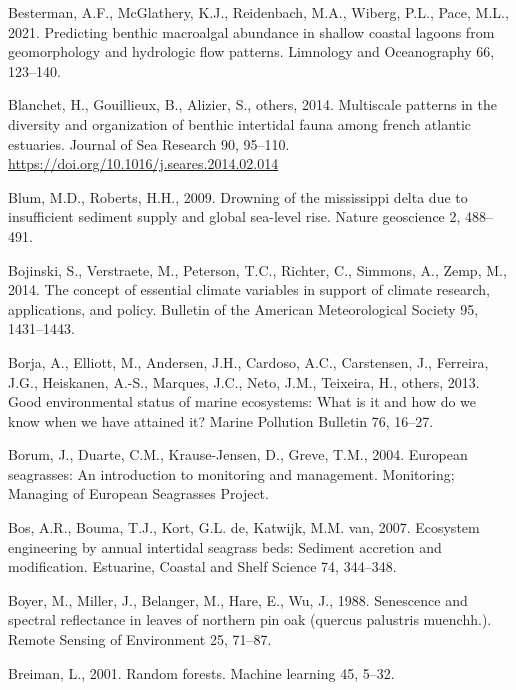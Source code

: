 \documentclass[
  letterpaper,
  11pt,
  english,
  singlespacing,
  headsepline]{MastersDoctoralThesis}
\newlength{\cslhangindent}
\newenvironment{CSLReferences}[2] %
 {\begin{list}{}{%
  \setlength{\itemindent}{0pt}
  \setlength{\leftmargin}{0pt}
  \setlength{\parsep}{0pt}
  \ifodd #1
   \setlength{\leftmargin}{\cslhangindent}
   \setlength{\itemindent}{-1\cslhangindent}
  \fi
  \setlength{\itemsep}{#2\baselineskip}}}
 {\end{list}}
\begin{document}
\begin{CSLReferences}{1}{0}
Besterman, A.F., McGlathery, K.J., Reidenbach, M.A., Wiberg, P.L., Pace,
M.L., 2021. Predicting benthic macroalgal abundance in shallow coastal
lagoons from geomorphology and hydrologic flow patterns. Limnology and
Oceanography 66, 123--140.

Blanchet, H., Gouillieux, B., Alizier, S., others, 2014. Multiscale
patterns in the diversity and organization of benthic intertidal fauna
among french atlantic estuaries. Journal of Sea Research 90, 95--110.
\url{https://doi.org/10.1016/j.seares.2014.02.014}

Blum, M.D., Roberts, H.H., 2009. Drowning of the mississippi delta due
to insufficient sediment supply and global sea-level rise. Nature
geoscience 2, 488--491.

Bojinski, S., Verstraete, M., Peterson, T.C., Richter, C., Simmons, A.,
Zemp, M., 2014. The concept of essential climate variables in support of
climate research, applications, and policy. Bulletin of the American
Meteorological Society 95, 1431--1443.

Borja, A., Elliott, M., Andersen, J.H., Cardoso, A.C., Carstensen, J.,
Ferreira, J.G., Heiskanen, A.-S., Marques, J.C., Neto, J.M., Teixeira,
H., others, 2013. Good environmental status of marine ecosystems: What
is it and how do we know when we have attained it? Marine Pollution
Bulletin 76, 16--27.

Borum, J., Duarte, C.M., Krause-Jensen, D., Greve, T.M., 2004. European
seagrasses: An introduction to monitoring and management. Monitoring;
Managing of European Seagrasses Project.

Bos, A.R., Bouma, T.J., Kort, G.L. de, Katwijk, M.M. van, 2007.
Ecosystem engineering by annual intertidal seagrass beds: Sediment
accretion and modification. Estuarine, Coastal and Shelf Science 74,
344--348.

Boyer, M., Miller, J., Belanger, M., Hare, E., Wu, J., 1988. Senescence
and spectral reflectance in leaves of northern pin oak (quercus
palustris muenchh.). Remote Sensing of Environment 25, 71--87.

Breiman, L., 2001. Random forests. Machine learning 45, 5--32.


\end{CSLReferences}
\end{document}
